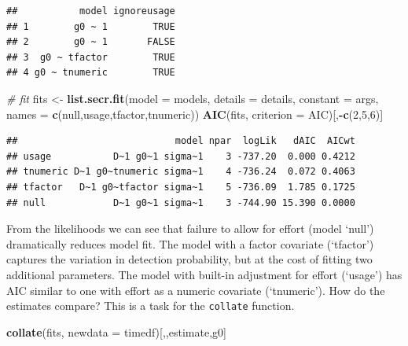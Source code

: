 \documentclass[
]{book}
\newenvironment{Shaded}{\begin{snugshade}}{\end{snugshade}}
\newcommand{\AttributeTok}[1]{\textcolor[rgb]{0.13,0.29,0.53}{#1}}
\newcommand{\CommentTok}[1]{\textcolor[rgb]{0.56,0.35,0.01}{\textit{#1}}}
\newcommand{\DecValTok}[1]{\textcolor[rgb]{0.00,0.00,0.81}{#1}}
\newcommand{\FunctionTok}[1]{\textcolor[rgb]{0.13,0.29,0.53}{\textbf{#1}}}
\newcommand{\NormalTok}[1]{#1}
\newcommand{\OtherTok}[1]{\textcolor[rgb]{0.56,0.35,0.01}{#1}}
\newcommand{\SpecialCharTok}[1]{\textcolor[rgb]{0.81,0.36,0.00}{\textbf{#1}}}
\newcommand{\StringTok}[1]{\textcolor[rgb]{0.31,0.60,0.02}{#1}}
\begin{document}
\begin{verbatim}
##           model ignoreusage
## 1        g0 ~ 1        TRUE
## 2        g0 ~ 1       FALSE
## 3  g0 ~ tfactor        TRUE
## 4 g0 ~ tnumeric        TRUE
\end{verbatim}

\begin{Shaded}
\begin{Highlighting}[]
\CommentTok{\# fit}
\NormalTok{fits }\OtherTok{\textless{}{-}} \FunctionTok{list.secr.fit}\NormalTok{(}\AttributeTok{model =}\NormalTok{ models, }\AttributeTok{details =}\NormalTok{ details, }\AttributeTok{constant =} 
\NormalTok{    args, }\AttributeTok{names =} \FunctionTok{c}\NormalTok{(}\StringTok{\textquotesingle{}null\textquotesingle{}}\NormalTok{,}\StringTok{\textquotesingle{}usage\textquotesingle{}}\NormalTok{,}\StringTok{\textquotesingle{}tfactor\textquotesingle{}}\NormalTok{,}\StringTok{\textquotesingle{}tnumeric\textquotesingle{}}\NormalTok{))}
\FunctionTok{AIC}\NormalTok{(fits, }\AttributeTok{criterion =} \StringTok{\textquotesingle{}AIC\textquotesingle{}}\NormalTok{)[,}\SpecialCharTok{{-}}\FunctionTok{c}\NormalTok{(}\DecValTok{2}\NormalTok{,}\DecValTok{5}\NormalTok{,}\DecValTok{6}\NormalTok{)]}
\end{Highlighting}
\end{Shaded}

\begin{verbatim}
##                            model npar  logLik   dAIC  AICwt
## usage           D~1 g0~1 sigma~1    3 -737.20  0.000 0.4212
## tnumeric D~1 g0~tnumeric sigma~1    4 -736.24  0.072 0.4063
## tfactor   D~1 g0~tfactor sigma~1    5 -736.09  1.785 0.1725
## null            D~1 g0~1 sigma~1    3 -744.90 15.390 0.0000
\end{verbatim}

From the likelihoods we can see that failure to allow for effort (model `null') dramatically reduces model fit. The model with a factor covariate (`tfactor') captures the variation in detection probability, but at the cost of fitting two additional parameters. The model with built-in adjustment for effort (`usage') has AIC similar to one with effort as a numeric covariate (`tnumeric'). How do the estimates compare? This is a task for the \texttt{collate} function.

\begin{Shaded}
\begin{Highlighting}[]
\FunctionTok{collate}\NormalTok{(fits, }\AttributeTok{newdata =}\NormalTok{ timedf)[,,}\StringTok{\textquotesingle{}estimate\textquotesingle{}}\NormalTok{,}\StringTok{\textquotesingle{}g0\textquotesingle{}}\NormalTok{]}
\end{Highlighting}
\end{Shaded}
\end{document}
